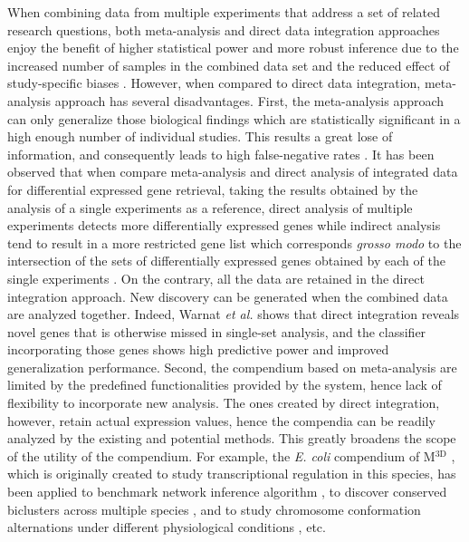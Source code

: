 When combining data from multiple experiments that address a set of related research questions, both meta-analysis and direct data integration approaches enjoy the benefit of higher statistical power and more robust inference due to the increased number of samples in the combined data set and the reduced effect of study-specific biases \cite{Sutton2001, Xu2005, Warnat2005}. However, when compared to direct data integration, meta-analysis approach has several disadvantages. First, the meta-analysis approach can only generalize those biological findings which are statistically significant in a high enough number of individual studies.  This results a great lose of information, and consequently leads to high false-negative rates \cite{Lazar2012, Xu2008}. It has been observed that when compare meta-analysis and direct analysis of integrated data for differential expressed gene retrieval, taking the results obtained by the analysis of a single experiments as a reference, direct analysis of multiple experiments detects more differentially expressed genes while indirect analysis tend to result in a more restricted gene list which corresponds \textit{grosso modo} to the intersection of the sets of differentially expressed genes obtained by each of the single experiments \cite{Fierro2008}. On the contrary, all the data are retained in the direct integration approach. New discovery can be generated when the combined data are analyzed together. Indeed, Warnat \textit{et al.} \cite{Warnat2005} shows that direct integration reveals novel genes that is otherwise missed in single-set analysis, and the classifier incorporating those genes shows high predictive power and improved generalization performance. Second, the compendium based on meta-analysis are limited by the predefined functionalities provided by the system, hence lack of flexibility to incorporate new analysis.   The ones created by direct integration, however, retain actual expression values, hence the compendia can be readily analyzed by the existing and potential methods.  This greatly broadens the scope of the utility of the compendium. For example, the \textit{E. coli} compendium of M$^{\textrm{3D}}$ \cite{Faith2008}, which is originally created to study transcriptional regulation in this species, has been applied to benchmark network inference algorithm \cite{Marbach2012}, to discover conserved biclusters across multiple species \cite{Kacmarczyk2011}, and to study chromosome conformation alternations under different physiological conditions \cite{Ma2013}, etc.








